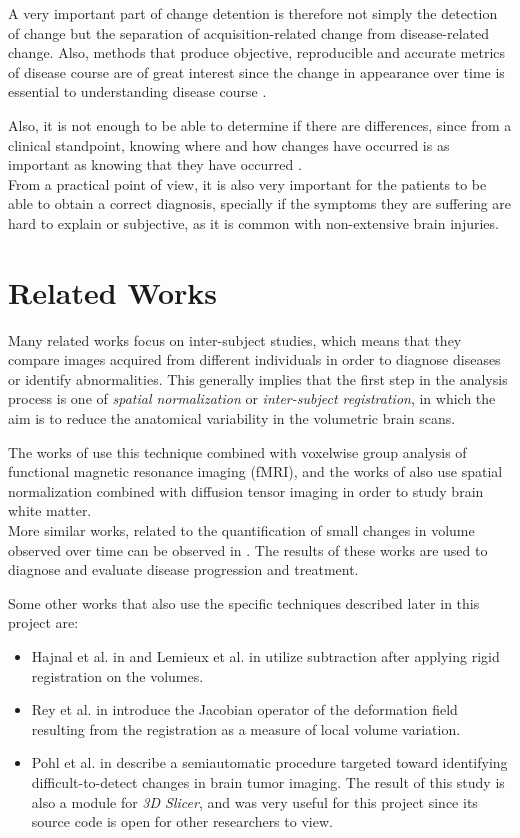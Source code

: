 A very important part of change detention is therefore not simply the detection of change but the separation of acquisition-related change from disease-related change. Also, methods that produce objective, reproducible and accurate metrics of disease course are of great interest since the change in appearance over time is essential to understanding disease course \cite{review1}.

Also, it is not enough to be able to determine if there are differences, since from a clinical standpoint, knowing where and how changes have occurred is as important as knowing that they have occurred \cite{review1}.\\


From a practical point of view, it is also very important for the patients to be able to obtain a correct diagnosis, specially if the symptoms they are suffering are hard to explain or subjective, as it is common with non-extensive brain injuries.

\section{Related Works}
Many related works focus on inter-subject studies, which means that they compare images acquired from different individuals in order to diagnose diseases or identify abnormalities. This generally implies that the first step in the analysis process is one of \textit{spatial normalization} or \textit{inter-subject registration}, in which the aim is to reduce the anatomical variability in the volumetric brain scans.

The works of \cite{zeffiro,svensen} use this technique combined with voxelwise group analysis of functional magnetic resonance imaging (fMRI), and the works of \cite{ardekani1,jones} also use spatial normalization combined with diffusion tensor imaging in order to study brain white matter.\\

More similar works, related to the quantification of small changes in volume observed over time can be observed in \cite{holden,rey}. The results of these works are used to diagnose and evaluate disease progression and treatment.


Some other works that also use the specific techniques described later in this project are:
\begin{itemize}
\item Hajnal et al. in \cite{hajnal} and Lemieux et al. in \cite{lemieux} utilize subtraction after applying rigid registration on the volumes.
\item Rey et al. in \cite{rey} introduce the Jacobian operator of the deformation field resulting from the registration as a measure of local volume variation.
\item Pohl et al. in \cite{pohlCT} describe a semiautomatic procedure targeted toward identifying difficult-to-detect changes in brain tumor imaging. The result of this study is also a module for \textit{3D Slicer}, and was very useful for this project since its source code is open for other researchers to view.
\end{itemize}


